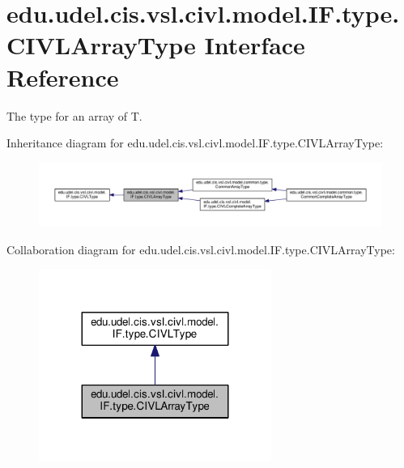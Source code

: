 \hypertarget{interfaceedu_1_1udel_1_1cis_1_1vsl_1_1civl_1_1model_1_1IF_1_1type_1_1CIVLArrayType}{}\section{edu.\+udel.\+cis.\+vsl.\+civl.\+model.\+I\+F.\+type.\+C\+I\+V\+L\+Array\+Type Interface Reference}
\label{interfaceedu_1_1udel_1_1cis_1_1vsl_1_1civl_1_1model_1_1IF_1_1type_1_1CIVLArrayType}


The type for an array of T.  




Inheritance diagram for edu.\+udel.\+cis.\+vsl.\+civl.\+model.\+I\+F.\+type.\+C\+I\+V\+L\+Array\+Type\+:
\nopagebreak
\begin{figure}[H]
\begin{center}
\leavevmode
\includegraphics[width=350pt]{interfaceedu_1_1udel_1_1cis_1_1vsl_1_1civl_1_1model_1_1IF_1_1type_1_1CIVLArrayType__inherit__graph}
\end{center}
\end{figure}


Collaboration diagram for edu.\+udel.\+cis.\+vsl.\+civl.\+model.\+I\+F.\+type.\+C\+I\+V\+L\+Array\+Type\+:
\nopagebreak
\begin{figure}[H]
\begin{center}
\leavevmode
\includegraphics[width=215pt]{interfaceedu_1_1udel_1_1cis_1_1vsl_1_1civl_1_1model_1_1IF_1_1type_1_1CIVLArrayType__coll__graph}
\end{center}
\end{figure}
